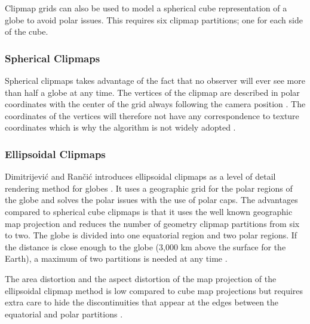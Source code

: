 Clipmap grids can also be used to model a spherical cube representation of a globe to avoid polar issues. This requires six clipmap partitions; one for each side of the cube.

\subsubsection{Spherical Clipmaps}
Spherical clipmaps takes advantage of the fact that no observer will ever see more than half a globe at any time. The vertices of the clipmap are described in polar coordinates with the center of the grid always following the camera position \cite{clasen06}. The coordinates of the vertices will therefore not have any correspondence to texture coordinates which is why the algorithm is not widely adopted \cite{dimi15}. 

\subsubsection{Ellipsoidal Clipmaps}
Dimitrijevi\'{c} and Ran\v{c}i\'{c} introduces ellipsoidal clipmaps as a level of detail rendering method for globes \cite{dimi15}. It uses a geographic grid for the polar regions of the globe and solves the polar issues with the use of polar caps. The advantages compared to spherical cube clipmaps is that it uses the well known geographic map projection and reduces the number of geometry clipmap partitions from six to two. The globe is divided into one equatorial region and two polar regions. If the distance is close enough to the globe (3,000 km above the surface for the Earth), a maximum of two partitions is needed at any time \cite{dimi15}.

The area distortion and the aspect distortion of the map projection of the ellipsoidal clipmap method is low compared to cube map projections but requires extra care to hide the discontinuities that appear at the edges between the equatorial and polar partitions \cite{dimi15}.

